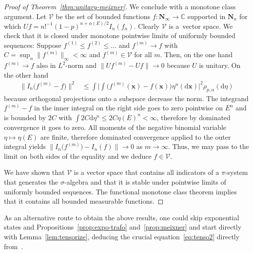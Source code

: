 \documentclass[10pt,a4paper]{amsart}
\numberwithin{equation}{section}
\newcommand{\C}{\mathbb{C}}
\newcommand{\dd}{\mathrm{d}} %
\newcommand{\vect}[1]{\boldsymbol{#1}}
\newcommand{\1}{\mathbbm{1}}
\begin{document}
\begin{proof}[Proof of Theorem~\ref{thm:unitary-meixner}]
	We conclude with a monotone class argument. Let $\mathcal V$ be the set of bounded functions $f\colon\mathbf N_\infty\to \C$ supported in $\mathbf N_n$ for which $U f = n!^{-1} (1-p)^{n+\alpha(E)/2} I_n(f_n)$. Clearly $\mathcal V$ is a~vector space. We check that it is closed under monotone pointwise limits of uniformly bounded sequences: Suppose $f^{(1)} \leq f^{(2)} \leq \ldots$ and $f^{(m)} \to f$ with $C = \sup_n\bigl\|f^{(m)}\bigr\|_\infty< \infty$ and $f^{(m)}\in \mathcal V$ for all $m$. Then, on the one hand $f^{(m)} \to f$ also in $L^2$-norm and $\bigl\| Uf^{(m)} - U f\bigr\| \to 0$ because $U$ is unitary. On the other hand 	
	\begin{align*}
		\bigl\|I_n\bigl(f^{(m)}- f\bigr)\bigr\|^2 & \leq \int \biggl| \int \bigl(f^{(m)}(\vect x) - f(\vect x) \bigr) \eta^n(\dd \vect x) \biggr|^2 \rho_{p,\alpha}(\dd \eta)
	\end{align*}
	because orthogonal projections onto a subspace decrease the norm. The integrand $f^{(m)} -f$ in the inner integral on the right side goes to zero pointwise on $E^n$ and is bounded by $2C$ with $\int 2 C \dd \eta^{n} \leq 2 C\eta(E)^n<\infty$, therefore by dominated convergence it goes to zero. All moments of the negative binomial variable $\eta\mapsto \eta(E)$ are finite, therefore dominated convergence applied to the outer integral yields $\bigl\|I_n\bigl(f^{(m)}\bigr) - I_n(f)\bigr\|\to 0$ as $m\to \infty$. Thus, we may pass to the limit on both sides of the equality  and we deduce $f\in \mathcal V$.
	
	We have shown that $\mathcal V$ is a vector space that contains all indicators of a $\pi$-system that generates the $\sigma$-algebra and that it is stable under pointwise limits of uniformly bounded sequences. The functional monotone class theorem \cite[Theorem 2.12.9]{bogachev-vol1} implies that it contains all bounded measurable functions.
\end{proof}


As an alternative route to obtain the above results, one could skip exponential states and Propositions~\ref{prop:expo-trafo} and~\ref{prop:meixner} and start directly with Lemma~\ref{lem:tensorize}, deducing the crucial equation~\eqref{eq:tenso2} directly from~\cite[Theorem 3.1]{carinci2019orthogonal}.

\appendix
\end{document}
